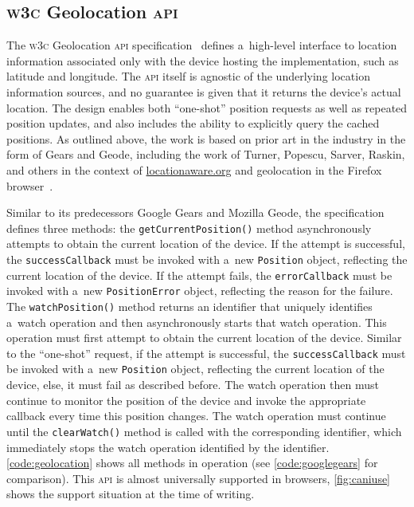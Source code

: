 \documentclass[sigconf,hyphens]{acmart}
\begin{document}
\subsection{\textsc{w3c} Geolocation \textsc{api}}

The \textsc{w3c} Geolocation \textsc{api} specification~\cite{popescu2016geolocation}
defines a~high-level interface to location information
associated only with the device hosting the implementation, such as latitude and longitude.
The \textsc{api} itself is agnostic of the underlying location information sources,
and no guarantee is given that it returns the device's actual location.
The design enables both ``one-shot'' position requests as well as repeated position updates,
and also includes the ability to explicitly query the cached positions.
As outlined above, the work is based on prior art in the industry in the form of Gears and Geode,
including the work of Turner, Popescu, Sarver, Raskin, and others in the context of
\url{locationaware.org} and geolocation in the Firefox browser~\cite{raskin2010geolocation}.

Similar to its predecessors Google Gears and Mozilla Geode,
the specification defines three methods:
the \texttt{getCurrentPosition()} method asynchronously attempts
to obtain the current location of the device.
If the attempt is successful, the \texttt{successCallback} must be invoked
with a~new \texttt{Position} object, reflecting the current location of the device.
If the attempt fails, the \texttt{errorCallback} must be invoked
with a~new \texttt{PositionError} object,
reflecting the reason for the failure.
The \texttt{watchPosition()} method returns an identifier that uniquely
identifies a~watch operation and then asynchronously starts that watch operation.
This operation must first attempt to obtain the current location of the device.
Similar to the ``one-shot'' request,
if the attempt is successful, the \texttt{successCallback} must be invoked
with a~new \texttt{Position} object, reflecting the current location of the device,
else, it must fail as described before.
The watch operation then must continue to monitor the position of the device
and invoke the appropriate callback every time this position changes.
The watch operation must continue until the \texttt{clearWatch()} method
is called with the corresponding identifier,
which immediately stops the watch operation identified by the identifier.
\autoref{code:geolocation} shows all methods in operation
(see \autoref{code:googlegears} for comparison). 
This \textsc{api} is almost universally supported in browsers,
\autoref{fig:caniuse} shows the support situation at the time of writing.
\end{document}
